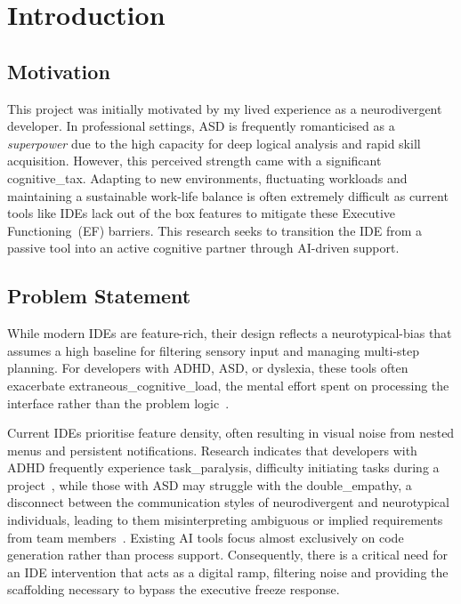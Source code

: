 \section{Introduction}
\subsection{Motivation}
This project was initially motivated by my lived experience as a \gls{neurodivergent} developer. In professional settings, \gls{ASD} is frequently 
romanticised as a \textit{superpower} due to the high capacity for deep logical analysis
and rapid skill acquisition. However, this perceived strength came with a significant \gls{cognitive_tax}. Adapting to new environments, fluctuating workloads and 
maintaining a sustainable work-life balance is often extremely difficult as current tools like \glspl{IDE} lack out of the box features to mitigate 
these Executive Functioning~(\gls{EF}) barriers. This research seeks to transition the \gls{IDE} from a passive tool into an active cognitive partner through \gls{AI}-driven support.


\subsection{Problem Statement}
While modern \glspl{IDE} are feature-rich, their design reflects a \gls{neurotypical-bias} that assumes a high baseline for filtering sensory input and managing 
multi-step planning. For developers with \gls{ADHD}, \gls{ASD}, or \gls{dyslexia}, these tools often exacerbate \gls{extraneous_cognitive_load}, 
the mental effort spent on processing the interface rather 
than the problem logic~\cite{sweller1988cognitive}.

Current \glspl{IDE} prioritise feature density, often resulting in visual noise from nested menus and persistent notifications. Research indicates that developers with \gls{ADHD} 
frequently experience \gls{task_paralysis}, difficulty initiating tasks during a project~\cite{bramham2009executive}, while those with \gls{ASD} may struggle with the \gls{double_empathy}, a disconnect between the communication
styles of neurodivergent and neurotypical individuals, leading to them misinterpreting 
ambiguous or implied requirements from team members~\cite{Milton01102012}. Existing \gls{AI} tools focus almost exclusively on code generation rather than process support. Consequently, there is a critical need 
for an \gls{IDE} intervention that acts as a digital ramp, filtering noise and providing the \gls{scaffolding} necessary to bypass the executive freeze response.

